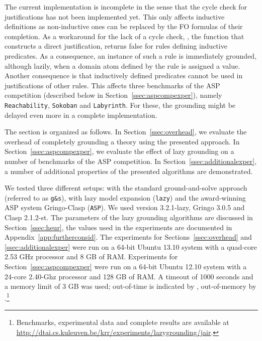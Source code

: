 \documentclass[11pt]{article}
\newcommand{\logicname}[1]{\text{\sc #1}\xspace}
\newcommand{\idp}{\logicname{IDP}}
\theoremstyle{plain}
\theoremstyle{definition}
\theoremstyle{example_basic}
\theoremstyle{example_contd}
\theoremstyle{plain}
\newcommand{\reach}				{\texttt{Reachability}\xspace}
\newcommand{\sokoban}			{\texttt{Sokoban}\xspace}
\newcommand{\labyrinth}			{\texttt{Labyrinth}\xspace}
\newcommand{\change}[1]{#1}
\begin{document}
\change{The current implementation is incomplete in the sense that the
  cycle check for justifications has not been implemented yet. This only
  affects inductive definitions as non-inductive ones can be replaced
  by the FO formulas of their completion. As a workaround for the lack
  of a cycle check, \buildconstr, the function that constructs a
  direct justification, returns false for rules defining
  inductive predicates. As a consequence, an instance of such a rule
  is immediately grounded, although lazily, when a domain atom defined
  by the rule is assigned a value. Another consequence is that inductively defined   predicates cannot be used in justifications of other rules. This affects three benchmarks of the ASP competition (described below in Section~\ref{ssec:aspcompexper}), namely \reach, \sokoban and \labyrinth. For these, the grounding might be delayed even more in a complete implementation.}

The section is organized as follows. In Section~\ref{ssec:overhead}, we evaluate the overhead of completely grounding a theory using the presented approach. In Section~\ref{ssec:aspcompexper}, we evaluate the effect of lazy grounding on a number of benchmarks of the ASP competition. In Section~\ref{ssec:additionalexper}, a number of additional properties of the presented algorithms are demonstrated.

We tested three different setups: \idp with the standard ground-and-solve approach (referred to as \texttt{g\&s}), \idp with lazy model expansion (\texttt{lazy}) and the award-winning ASP system Gringo-Clasp (\texttt{ASP}). We used \idp version 3.2.1-lazy, Gringo 3.0.5 and Clasp 2.1.2-st. \change{The parameters of the lazy grounding algorithms are discussed in Section~\ref{ssec:heur}, the values used in the experiments are documented in Appendix~\ref{app:furtherconsid}.} \change{The experiments for Sections~\ref{ssec:overhead} and \ref{ssec:additionalexper} were run on a 64-bit Ubuntu 13.10 system with a quad-core 2.53 GHz processor and 8 GB of RAM. Experiments for Section~\ref{ssec:aspcompexper} were run on a 64-bit Ubuntu 12.10 system with a 24-core 2.40-Ghz processor and 128 GB of RAM.} A timeout of 1000 seconds and a memory limit of 3 GB was used; out-of-time is indicated by \tout, out-of-memory by \mout.\footnote{Benchmarks, experimental data and complete results are available at \url{http://dtai.cs.kuleuven.be/krr/experiments/lazygrounding/jair}.}
\end{document}
